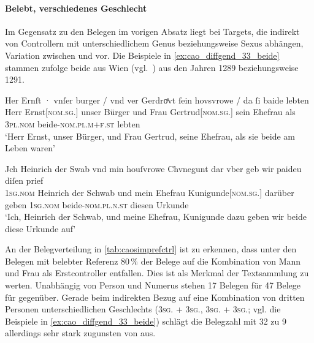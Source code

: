 \paragraph{Belebt, verschiedenes Geschlecht}

Im Gegensatz zu den Belegen im vorigen Absatz liegt bei Targets, die indirekt
von Controllern mit unterschiedlichem Genus beziehungsweise Sexus abhängen,
Variation zwischen  und  vor. Die Beispiele in
\cref{ex:cao_diffgend_33_beide} stammen \citet{cao-online} zufolge beide aus
Wien (vgl.~) aus den Jahren 1289 beziehungsweise 1291.

\begin{exe}
\ex \label{ex:cao_diffgend_33_beide}
	\begin{xlist}
	\ex \label{ex:cao_diffgend_33_beide_1}
		\gll Her Ernſt · vnſer burger / vnd ver Gerdroͤvt ſein
			hovsvrowe / da ſi baide lebten \\
			Herr Ernst[\textsc{nom.sg.\MascM}] {} unser Bürger {} und Frau
			Gertrud[\textsc{nom.sg.\FemF}] sein Ehefrau {} als \textsc{3pl\subMF.nom}
			beide-\textsc{nom.pl.m+f\subMF.st} lebten \\
		\trans `Herr Ernst, unser Bürger, und Frau Gertrud, seine Ehefrau,
			als sie beide am Leben waren'
			\parencites(Nr.~1073, Wien, 1289)[374,40--41]{cao2}

	\ex \label{ex:cao_diffgend_33_beide_2}
		\gll Jch Heinrich der Swab vnd min houſvrowe Chvnegunt
			\textelp{} {dar vber} geb wir paideu diſen
			prief \\
			\textsc{1sg\subM.nom} Heinrich der Schwab und mein Ehefrau
			Kunigunde[\textsc{nom.sg.\FemF}] {} darüber geben \textsc{1sg\subMF.nom}
			beide-\textsc{nom.pl.n\subMF.st} diesen Urkunde \\
		\trans `Ich, Heinrich der Schwab, und meine Ehefrau, Kunigunde
			\textelp{} dazu geben wir beide diese Urkunde auf'
				\parencites(Nr.~N~475, Wien, 1291)[342,19 und 28]{cao5}
	\end{xlist}
\end{exe}

An der Belegverteilung in \cref{tab:caosimprefctrl} ist zu erkennen, dass unter
den Belegen mit belebter Referenz 80\,\% der Belege auf die Kombination von
Mann und Frau als Erstcontroller entfallen. Dies ist als Merkmal der
Textsammlung zu werten. Unabhängig von Person und Numerus stehen 17 Belegen für
 47 Belege für  gegenüber. Gerade beim
indirekten Bezug auf eine Kombination von dritten Personen unterschiedlichen
Geschlechts (\textsc{3sg.\MascM{} + 3sg.\FemF}, \textsc{3sg.\FemF{} +
3sg.\MascM}; vgl. die Beispiele in \cref{ex:cao_diffgend_33_beide}) schlägt die
Belegzahl mit 32 zu 9 allerdings sehr stark zugunsten von  aus.

